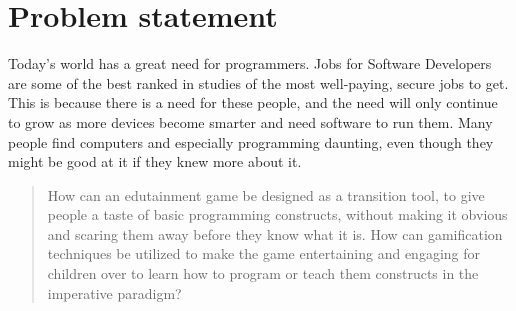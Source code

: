 \section{Problem statement}
\label{sec:problemstatement}

Today's world has a great need for programmers. Jobs for Software Developers are some of the best ranked in studies of the most well-paying, secure jobs to get. This is because there is a need for these people, and the need will only continue to grow as more devices become smarter and need software to run them.
Many people find computers and especially programming daunting, even though they might be good at it if they knew more about it.\newline

\begin{quotation}
	How can an edutainment game be designed as a transition tool, to give people a taste of basic programming constructs, without  making it obvious and scaring them away before they know what it is. How can gamification techniques be utilized to make the game entertaining and engaging for children over  to learn how to program or teach them constructs in the imperative paradigm?
\end{quotation}
